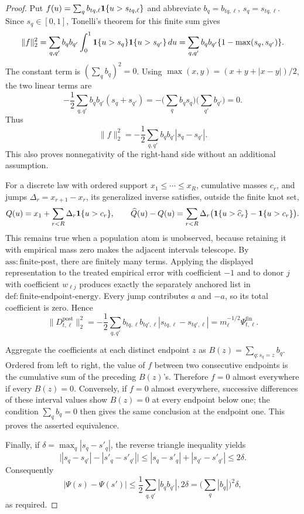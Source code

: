 \documentclass{article}
\begin{document}
\begin{proof}
Put \(f(u)=\sum_q b_{tq,\ell}{\bf 1}\{u>s_{tq,\ell}\}\) and abbreviate \(b_q=b_{tq,\ell}\), \(s_q=s_{tq,\ell}\).  Since \(s_q\in[0,1]\), Tonelli's theorem for this finite sum gives
\[
 \|f\|_2^2
 =\sum_{q,q'}b_qb_{q'}\int_0^1{\bf 1}\{u>s_q\}{\bf 1}\{u>s_{q'}\}\,du
 =\sum_{q,q'}b_qb_{q'}\{1-\max(s_q,s_{q'})\}.
\]
The constant term is \((\sum_qb_q)^2=0\).  Using
\(\max(x,y)=(x+y+|x-y|)/2\), the two linear terms are
\[
 -\frac12\sum_{q,q'}b_qb_{q'}(s_q+s_{q'})
 =-\Big(\sum_qb_qs_q\Big)\Big(\sum_{q'}b_{q'}\Big)=0.
\]
Thus
\[
 \|f\|_2^2=-\frac12\sum_{q,q'}b_qb_{q'}|s_q-s_{q'}|.
\]
This also proves nonnegativity of the right-hand side without an additional assumption.

For a discrete law with ordered support \(x_1\leq\cdots\leq x_R\), cumulative masses \(c_r\), and jumps \(\Delta_r=x_{r+1}-x_r\), its generalized inverse satisfies, outside the finite knot set,
\[
 Q(u)=x_1+\sum_{r<R}\Delta_r{\bf 1}\{u>c_r\},\qquad
 \widehat Q(u)-Q(u)=\sum_{r<R}\Delta_r
 \bigl({\bf 1}\{u>\widehat c_r\}-{\bf 1}\{u>c_r\}\bigr).
\]
This remains true when a population atom is unobserved, because retaining it with empirical mass zero makes the adjacent intervals telescope.  By \(\mathrm{ass:finite\mbox{-}post}\), there are finitely many terms.  Applying the displayed representation to the treated empirical error with coefficient \(-1\) and to donor \(j\) with coefficient \(w_{\ell j}\) produces exactly the separately anchored list in \(\mathrm{def:finite\mbox{-}endpoint\mbox{-}energy}\).  Every jump contributes \(a\) and \(-a\), so its total coefficient is zero.  Hence
\[
 \|D^{\mathrm{post}}_{t,\ell}\|_2^2
 =-\frac12\sum_{q,q'}b_{tq,\ell}b_{tq',\ell}
 |s_{tq,\ell}-s_{tq',\ell}|
 =m_\ell^{-1/2}\Psi^{\mathrm{fin}}_{t,\ell}.
\]

Aggregate the coefficients at each distinct endpoint \(z\) as \(B(z)=\sum_{q:s_q=z}b_q\).  Ordered from left to right, the value of \(f\) between two consecutive endpoints is the cumulative sum of the preceding \(B(z)\)'s.  Therefore \(f=0\) almost everywhere if every \(B(z)=0\).  Conversely, if \(f=0\) almost everywhere, successive differences of these interval values show \(B(z)=0\) at every endpoint below one; the condition \(\sum_qb_q=0\) then gives the same conclusion at the endpoint one.  This proves the asserted equivalence.

Finally, if \(\delta=\max_q|s_q-s'_q|\), the reverse triangle inequality yields
\[
 \big||s_q-s_{q'}|-|s'_q-s'_{q'}|\big|
 \leq |s_q-s'_q|+|s_{q'}-s'_{q'}|\leq2\delta.
\]
Consequently
\[
 |\Psi(s)-\Psi(s')|
 \leq\frac12\sum_{q,q'}|b_qb_{q'}|,2\delta
 =\Big(\sum_q|b_q|\Big)^2\delta,
\]
as required.
\end{proof}
\end{document}
